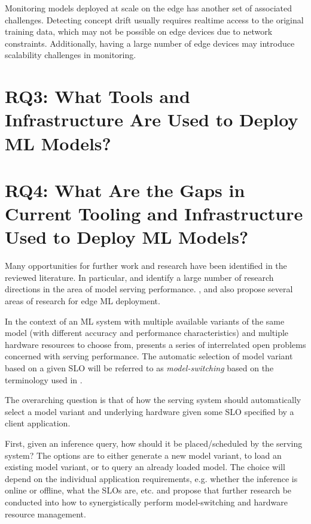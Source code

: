 Monitoring models deployed at scale on the edge has another set of associated challenges.
Detecting concept drift usually requires realtime access to the original training data, which may not be possible on edge devices due to network constraints.
Additionally, having a large number of edge devices may introduce scalability challenges \cite{Rausch2019} in monitoring.

\section{RQ3: What Tools and Infrastructure Are Used to Deploy ML Models?}
\section{RQ4: What Are the Gaps in Current Tooling and Infrastructure Used to Deploy ML Models?}

Many opportunities for further work and research have been identified in the reviewed literature.
In particular, \cite{Yadwadkar2019} and \cite{Zhang2020} identify a large number of research directions in the area of model serving performance.
\cite{Bosch2021}, \cite{Rausch2019} and \cite{Gupta2020} also propose several areas of research for edge ML deployment.

In the context of an ML system with multiple available variants of the same model (with different accuracy and performance characteristics) and multiple hardware resources to choose from, \cite{Yadwadkar2019} presents a series of interrelated open problems concerned with serving performance.
The automatic selection of model variant based on a given SLO will be referred to as \textit{model-switching} based on the terminology used in \cite{Zhang2020}. 

The overarching question is that of how the serving system should automatically select a model variant and underlying hardware given some SLO specified by a client application.

First, given an inference query, how should it be placed/scheduled by the serving system?
The options are to either generate a new model variant, to load an existing model variant, or to query an already loaded model.
The choice will depend on the individual application requirements, e.g. whether the inference is online or offline, what the SLOs are, etc.
\cite{Yadwadkar2019} and \cite{Zhang2020} propose that further research be conducted into how to synergistically perform model-switching and hardware resource management.

